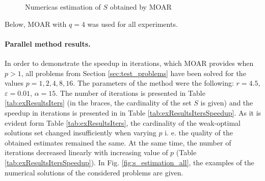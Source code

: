 \documentclass{llncs}
\begin{document}
\begin{figure}[ht]
    \centering
    \caption{Numericas estimation of \(S\) obtained by MOAR}
    \label{fig:fonseca_slater}
\end{figure}

Below, MOAR with \(q=4\) was used for all experiments.

\paragraph{Parallel method results.} In order to demonstrate the speedup in iterations, which
MOAR provides when \(p > 1\), all problems from Section \ref{sec:test_problems} have been
solved for the values \(p=1,2,4,8,16\). The parameters of the method were the following:
\(r=4.5\), \(\varepsilon=0.01\), \(\alpha=15\). The number of iterations is presented in Table \ref{tab:exResultsIters}
(in the braces, the cardinality of the set \(S\) is given) and the speedup in iterations is presented
in in Table \ref{tab:exResultsItersSpeedup}. As it is evident form Table
\ref{tab:exResultsIters}, the cardinality of the weak-optimal solutions set changed insufficiently when varying \(p\)
i. e. the quality of the obtained estimates remained the same. At the same time, the number of
iterations decreased linearly with increasing value of \(p\) (Table
\ref{tab:exResultsItersSpeedup}). In Fig. \ref{fig:s_estimation_all}, the examples of the
numerical solutions of the considered problems are given.
\end{document}
